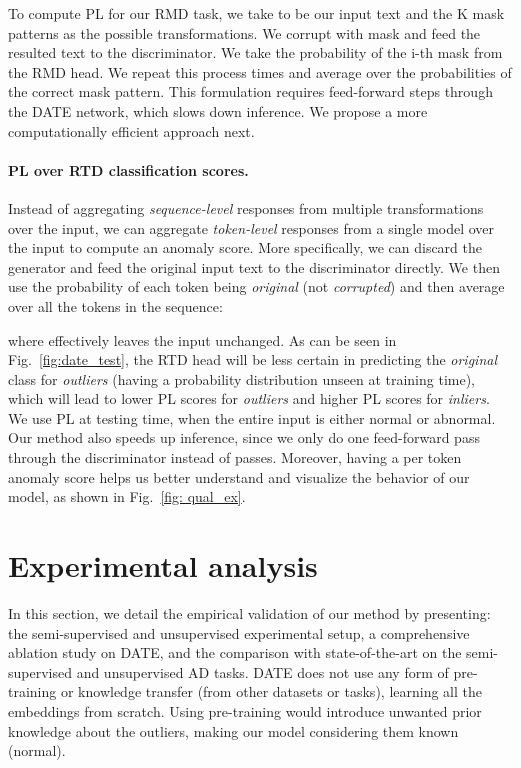 \documentclass[11pt]{article}
\begin{document}
To compute PL for our RMD task, we take  to be our input text and the K mask patterns as the possible transformations. We corrupt  with mask  and feed the resulted text to the discriminator. We take the probability of the i-th mask from the RMD head. We repeat this process  times and average over the probabilities of the correct mask pattern. This formulation requires  feed-forward steps through the DATE network, which slows down inference. We propose a more computationally efficient approach next.









\paragraph{PL over RTD classification scores.} Instead of aggregating \emph{sequence-level} responses from multiple transformations over the input, we can aggregate \emph{token-level} responses from a single model over the input to compute an anomaly score. More specifically, we can discard the generator and feed the original input text to the discriminator directly. We then use the probability of each token being \emph{original} (not \emph{corrupted}) and then average over all the tokens in the sequence:

where  effectively leaves the input unchanged.
As can be seen in Fig.~\ref{fig:date_test}, the RTD head will be less certain in predicting the \emph{original} class for \emph{outliers} (having a probability distribution unseen at training time), which will lead to lower PL scores for \emph{outliers} and higher PL scores for \emph{inliers}. We use PL at testing time, when the entire input is either normal or abnormal. Our method also speeds up inference, since we only do one feed-forward pass through the discriminator instead of  passes. Moreover, having a per token anomaly score helps us better understand and visualize the behavior of our model, as shown in Fig.~\ref{fig: qual_ex}.


\section{Experimental analysis}
In this section, we detail the empirical validation of our method by presenting: the semi-supervised and unsupervised experimental setup, a comprehensive ablation study on DATE, and the comparison with state-of-the-art on the semi-supervised and unsupervised AD tasks. DATE does not use any form of pre-training or knowledge transfer (from other datasets or tasks), learning all the embeddings from scratch. Using pre-training would introduce unwanted prior knowledge about the outliers, making our model considering them known (normal).
\end{document}
